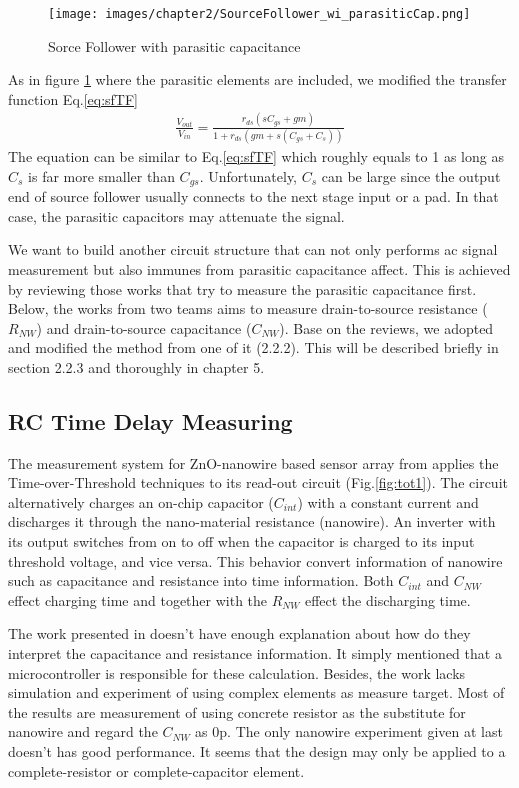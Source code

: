 \begin{figure}[h]
    \centering
    \texttt{[image: images/chapter2/SourceFollower\_wi\_parasiticCap.png]}
    \fontsize{6}{7}\selectfont
    \caption{Sorce Follower with parasitic capacitance}
    \label{fig:SF_pC}
\end{figure}

As in figure \ref{fig:SF_pC} where the parasitic elements are included, we modified the transfer function Eq.\ref{eq:sfTF}
\begin{align}
    \frac{V_{out}}{V_{in}} = \frac{r_{ds}(sC_{gs} + gm)}{1 + r_{ds}(gm + s(C_{gs}+C_s))}
\end{align}
The equation can be similar to Eq.\ref{eq:sfTF} which roughly equals to 1 as long as $C_s$ is far more smaller than $C_{gs}$.
Unfortunately, $C_s$ can be large since the output end of source follower usually connects to the next stage input or a pad.
In that case, the parasitic capacitors may attenuate the signal.

We want to build another circuit structure that can not only performs ac signal measurement but also immunes from parasitic capacitance affect.
This is achieved by reviewing those works that try to measure the parasitic capacitance first.
Below, the works from two teams aims to measure drain-to-source resistance ($R_{NW}$) and drain-to-source capacitance ($C_{NW}$).
Base on the reviews, we adopted and modified the method from one of it (2.2.2).
This will be described briefly in section 2.2.3 and thoroughly in chapter 5.

\subsection{RC Time Delay Measuring}
The measurement system for ZnO-nanowire based sensor array from \cite{Juv1} applies the Time-over-Threshold techniques to its read-out circuit (Fig.\ref{fig:tot1}).
The circuit alternatively charges an on-chip capacitor ($C_{int}$) with a constant current and discharges it through the nano-material resistance (nanowire).
An inverter with its output switches from on to off when the capacitor is charged to its input threshold voltage, and vice versa.
This behavior convert information of nanowire such as capacitance and resistance into time information.
Both $C_{int}$ and $C_{NW}$ effect charging time and together with the $R_{NW}$ effect the discharging time.

The work presented in \cite{Juv1} doesn't have enough explanation about how do they interpret the capacitance and resistance information.
It simply mentioned that a microcontroller is responsible for these calculation.
Besides, the work lacks simulation and experiment of using complex elements as measure target.
Most of the results are measurement of using concrete resistor as the substitute for nanowire and regard the $C_{NW}$ as 0p.
The only nanowire experiment given at last doesn't has good performance.
It seems that the design may only be applied to a complete-resistor or complete-capacitor element.

